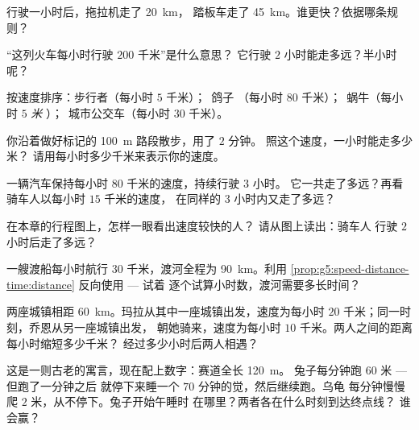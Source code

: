 \begin{exercise}[$\star$]\label{exo:g5:speed-distance-time:3}
行驶一小时后，拖拉机走了 \qty{20}{km}，
踏板车走了 \qty{45}{km}。谁更快？依据哪条规则？
\end{exercise}

\begin{exercise}[$\star$]\label{exo:g5:speed-distance-time:4}
“这列火车每小时行驶 $200$ 千米”是什么意思？
它行驶 $2$ 小时能走多远？半小时呢？
\end{exercise}

\begin{exercise}[$\star$]\label{exo:g5:speed-distance-time:5}
按速度排序：步行者（每小时 $5$ 千米）；\ 鸽子
（每小时 $80$ 千米）；\ 蜗牛（每小时 $5$ \emph{米}
）；\ 城市公交车（每小时 $30$ 千米）。
\end{exercise}

\begin{exercise}[$\star$]\label{exo:g5:speed-distance-time:6}
你沿着做好标记的 \qty{100}{m} 路段散步，用了 $2$ 分钟。
照这个速度，一小时能走多少米？
请用每小时多少千米来表示你的速度。
\end{exercise}

\begin{exercise}[$\star$]\label{exo:g5:speed-distance-time:7}
一辆汽车保持每小时 $80$ 千米的速度，持续行驶 $3$ 小时。
它一共走了多远？再看骑车人以每小时 $15$ 千米的速度，
在同样的 $3$ 小时内又走了多远？
\end{exercise}

\begin{exercise}[$\star$]\label{exo:g5:speed-distance-time:8}
在本章的行程图上，怎样一眼看出速度较快的人？
请从图上读出：骑车人
行驶 $2$ 小时后走了多远？
\end{exercise}

\begin{exercise}[$\star\star$]\label{exo:g5:speed-distance-time:9}
一艘渡船每小时航行 $30$ 千米，渡河全程为
\qty{90}{km}。利用
\cref{prop:g5:speed-distance-time:distance} 反向使用 --- 试着
逐个试算小时数，渡河需要多长时间？
\end{exercise}

\begin{exercise}[$\star\star$]\label{exo:g5:speed-distance-time:10}
两座城镇相距 \qty{60}{km}。玛拉从其中一座城镇出发，速度为每小时 $20$
千米；同一时刻，乔恩从另一座城镇出发，
朝她骑来，速度为每小时 $10$ 千米。两人之间的距离
每小时缩短多少千米？
经过多少小时后两人相遇？
\end{exercise}

\begin{exercise}[$\star\star$]\label{exo:g5:speed-distance-time:11}
这是一则古老的寓言，现在配上数字：赛道全长 \qty{120}{m}。
兔子每分钟跑 $60$ 米 --- 但跑了一分钟之后
就停下来睡一个 $70$ 分钟的觉，然后继续跑。乌龟
每分钟慢慢爬 $2$ 米，从不停下。兔子开始午睡时
在哪里？两者各在什么时刻到达终点线？
谁会赢？
\end{exercise}
